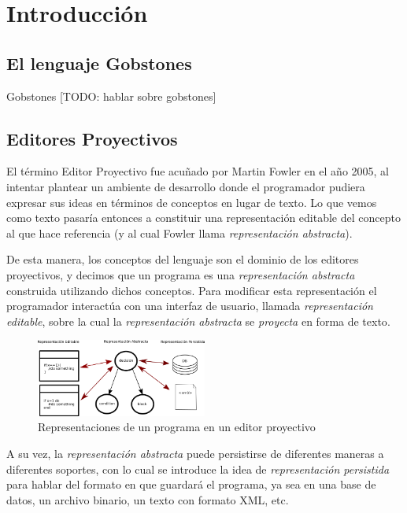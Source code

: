 \section{Introducción}

\subsection{El lenguaje Gobstones}

Gobstones\cite{Gobstones} [TODO: hablar sobre gobstones]

\subsection{Editores Proyectivos}

El término Editor Proyectivo fue acuñado por Martin Fowler en el año 2005\cite{Fowler}, al intentar plantear un ambiente de desarrollo donde el programador pudiera expresar sus ideas en términos de conceptos en lugar de texto. Lo que vemos como texto pasaría entonces a constituir una representación editable del concepto al que hace referencia (y al cual Fowler llama \textit{representación abstracta}).

De esta manera, los conceptos del lenguaje son el dominio de los editores proyectivos, y decimos que un programa es una \textit{representación abstracta} construida utilizando dichos conceptos. Para modificar esta representación el programador interactúa con una interfaz de usuario, llamada \textit{representación editable}, sobre la cual la \textit{representación abstracta} se \textit{proyecta} en forma de texto\cite{voelter2014projectional}. 

\begin{figure}
  \begin{center}
    \includegraphics[width=0.5\textwidth,keepaspectratio]{assets/projectional-editor.png}
    \caption{Representaciones de un programa en un editor proyectivo}
  \end{center}
\end{figure}


A su vez, la \textit{representación abstracta} puede persistirse de diferentes maneras a diferentes soportes, con lo cual se introduce la idea de \textit{representación persistida} para hablar del formato en que guardará el programa, ya sea en una base de datos, un archivo binario, un texto con formato XML, etc.


